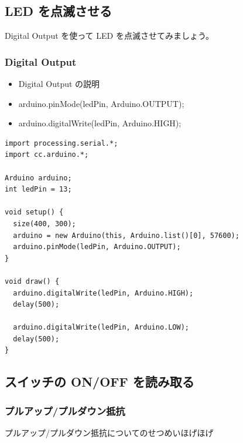\documentclass[11pt,a4paper]{jarticle}
\begin{document}
\subsection*{LED を点滅させる}
Digital Output を使って LED を点滅させてみましょう。

\subsubsection*{Digital Output}
\begin{itemize}
 \item Digital Output の説明
 \item arduino.pinMode(ledPin, Arduino.OUTPUT);
 \item arduino.digitalWrite(ledPin, Arduino.HIGH);
\end{itemize}

\begin{lstlisting}
import processing.serial.*;
import cc.arduino.*;
 
Arduino arduino;
int ledPin = 13;
 
void setup() {
  size(400, 300);
  arduino = new Arduino(this, Arduino.list()[0], 57600);
  arduino.pinMode(ledPin, Arduino.OUTPUT);
}
 
void draw() {
  arduino.digitalWrite(ledPin, Arduino.HIGH);
  delay(500);
  
  arduino.digitalWrite(ledPin, Arduino.LOW);
  delay(500);  
}
\end{lstlisting}


\subsection*{スイッチの ON/OFF を読み取る}

\subsubsection*{プルアップ/プルダウン抵抗}
プルアップ/プルダウン抵抗についてのせつめいほげほげ
\end{document}
